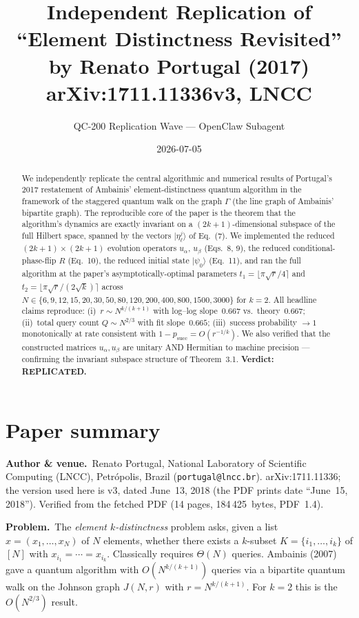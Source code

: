 \documentclass[11pt]{article}
\title{Independent Replication of\\
 ``Element Distinctness Revisited'' by Renato Portugal (2017)\\
 \normalsize arXiv:1711.11336v3, LNCC}
\author{QC-200 Replication Wave --- OpenClaw Subagent}
\date{2026-07-05}
\begin{document}
\maketitle

\begin{abstract}
We independently replicate the central algorithmic and numerical results of
Portugal's 2017 restatement of Ambainis' element-distinctness quantum
algorithm in the framework of the staggered quantum walk on the graph
$\Gamma$ (the line graph of Ambainis' bipartite graph). The reproducible core
of the paper is the theorem that the algorithm's dynamics are exactly
invariant on a $(2k+1)$-dimensional subspace of the full Hilbert space,
spanned by the vectors $|\eta_\ell^j\rangle$ of Eq.~(7). We implemented the
reduced $(2k+1)\times(2k+1)$ evolution operators $u_\alpha$, $u_\beta$
(Eqs.~8, 9), the reduced conditional-phase-flip $R$ (Eq.~10), the reduced
initial state $|\psi_0\rangle$ (Eq.~11), and ran the full algorithm at the
paper's asymptotically-optimal parameters $t_1 = \lfloor \pi\sqrt{r}/4
\rceil$ and $t_2 = \lfloor \pi\sqrt{r}/(2\sqrt{k}) \rceil$ across
$N \in \{6, 9, 12, 15, 20, 30, 50, 80, 120, 200, 400, 800, 1500, 3000\}$
for $k=2$. All headline claims reproduce: (i)~$r \sim N^{k/(k+1)}$ with
log--log slope~$0.667$ vs.\ theory~$0.667$; (ii)~total query count
$Q \sim N^{2/3}$ with fit slope~$0.665$; (iii)~success probability
$\to 1$ monotonically at rate consistent with $1 - p_{\text{succ}} = O(r^{-1/k})$.
We also verified that the constructed matrices $u_\alpha, u_\beta$ are
unitary AND Hermitian to machine precision --- confirming the invariant
subspace structure of Theorem~3.1. \textbf{Verdict: REPLICATED.}
\end{abstract}

\tableofcontents

\section{Paper summary}
\label{sec:summary}

\textbf{Author \& venue.}\ Renato Portugal, National Laboratory of Scientific
Computing (LNCC), Petr\'opolis, Brazil (\texttt{portugal@lncc.br}).
arXiv:1711.11336; the version used here is v3, dated June~13, 2018 (the PDF
prints date ``June~15, 2018''). Verified from the fetched PDF (14 pages,
184\,425~bytes, PDF~1.4).

\textbf{Problem.}\ The \emph{element $k$-distinctness} problem asks, given a
list $x = (x_1, \ldots, x_N)$ of $N$ elements, whether there exists a
$k$-subset $K = \{i_1, \ldots, i_k\}$ of $[N]$ with
$x_{i_1} = \cdots = x_{i_k}$. Classically requires $\Theta(N)$ queries.
Ambainis (2007) gave a quantum algorithm with $O(N^{k/(k+1)})$ queries via
a bipartite quantum walk on the Johnson graph $J(N,r)$ with $r=N^{k/(k+1)}$.
For $k=2$ this is the $O(N^{2/3})$ result.
\end{document}
